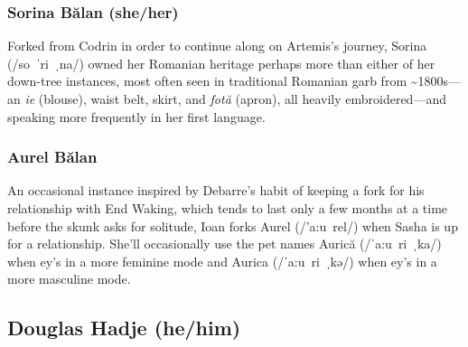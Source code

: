 \subsubsection{Sorina Bălan (she/her)}

Forked from Codrin in order to continue along on Artemis's journey, Sorina (/so~ˈri~ˌna/) owned her Romanian heritage perhaps more than either of her down-tree instances, most often seen in traditional Romanian garb from \textasciitilde1800s---an \emph{ie} (blouse), waist belt, skirt, and \emph{fotă} (apron), all heavily embroidered---and speaking more frequently in her first language.

\begin{comment}
\emph{Appears in:}

\begin{itemize}
\tightlist
\item
  \href{https://neviim.post-self.ink}{\emph{Nevi'im}}
\item
  \href{https://mitzvot.post-self.ink}{\emph{Mitzvot} and ``Selected Letters'}
\item
  ``Selected Letters''
\end{itemize}
\end{comment}

\subsubsection{Aurel Bălan}

An occasional instance inspired by Debarre's habit of keeping a fork for his relationship with End Waking, which tends to last only a few months at a time before the skunk asks for solitude, Ioan forks Aurel (/'a:u~rel/) when Sasha is up for a relationship. She'll occasionally use the pet names Aurică (/ˈa:u~ri~ˌka/) when ey's in a more feminine mode and Aurica (/ˈa:u~ri~ˌkə/) when ey's in a more masculine mode.

\begin{comment}
\emph{Appears in:}

\begin{itemize}
\tightlist
\item
  ``Selected Letters''
\end{itemize}
\end{comment}

\subsection{Douglas Hadje (he/him)}

